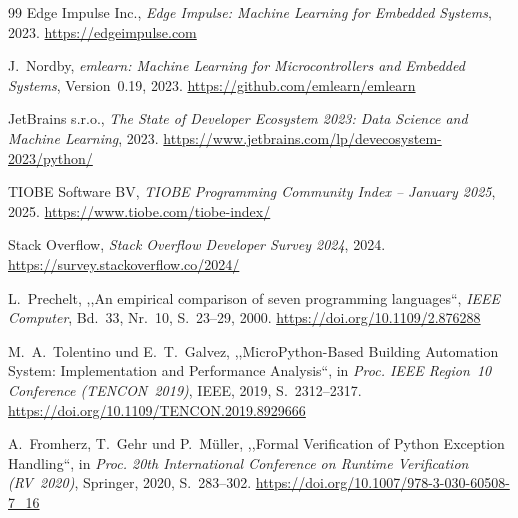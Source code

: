 ﻿\documentclass[12pt,a4paper,twoside]{article}
\newcommand{\doi}[1]{\url{https://doi.org/#1}}
\begin{document}
\begin{thebibliography}{99}
  {Edge Impulse Inc.},
  \textit{Edge Impulse: Machine Learning for Embedded Systems}, 2023.
  \url{https://edgeimpulse.com}

  J.~Nordby,
  \textit{emlearn: Machine Learning for Microcontrollers and Embedded Systems},
  Version~0.19, 2023.
  \url{https://github.com/emlearn/emlearn}

  {JetBrains s.r.o.},
  \textit{The State of Developer Ecosystem 2023: Data Science and Machine Learning},
  2023.
  \url{https://www.jetbrains.com/lp/devecosystem-2023/python/}


  {TIOBE Software BV},
  \textit{TIOBE Programming Community Index -- January 2025},
  2025.
  \url{https://www.tiobe.com/tiobe-index/}

  {Stack Overflow},
  \textit{Stack Overflow Developer Survey 2024}, 2024.
  \url{https://survey.stackoverflow.co/2024/}


  L.~Prechelt,
  ,,An empirical comparison of seven programming languages``,
  \textit{IEEE Computer}, Bd.~33, Nr.~10, S.~23--29, 2000.
  \doi{10.1109/2.876288}


  M.~A.~Tolentino und E.~T.~Galvez,
  ,,MicroPython-Based Building Automation System: Implementation and
  Performance Analysis``,
  in \textit{Proc. IEEE Region~10 Conference (TENCON~2019)},
  IEEE, 2019, S.~2312--2317.
  \doi{10.1109/TENCON.2019.8929666}


  A.~Fromherz, T.~Gehr und P.~Müller,
  ,,Formal Verification of Python Exception Handling``,
  in \textit{Proc. 20th International Conference on Runtime Verification
  (RV~2020)}, Springer, 2020, S.~283--302.
  \doi{10.1007/978-3-030-60508-7\_16}

\end{thebibliography}
\end{document}
